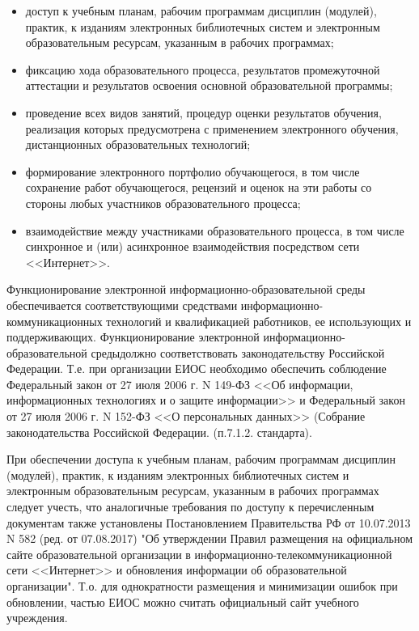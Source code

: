 \documentclass[10pt, a5paper]{article}
\begin{document}
\begin{itemize}
  \item доступ к учебным планам, рабочим программам дисциплин (модулей), практик, к изданиям электронных библиотечных систем и электронным образовательным ресурсам, указанным в рабочих программах;
  \item фиксацию хода образовательного процесса, результатов промежуточной аттестации и результатов освоения основной образовательной программы;
  \item проведение всех видов занятий, процедур оценки результатов обучения, реализация которых предусмотрена с применением электронного обучения, дистанционных образовательных технологий;
  \item формирование электронного портфолио обучающегося, в том числе сохранение работ обучающегося, рецензий и оценок на эти работы со стороны любых участников образовательного процесса;
  \item взаимодействие между участниками образовательного процесса, в том числе синхронное и (или) асинхронное взаимодействия посредством сети <<Интернет>>.
\end{itemize}

Функционирование электронной информационно-\linebreak образовательной среды обеспечивается соответствующими средствами информационно-коммуникационных технологий и квалификацией работников, ее использующих и поддерживающих. Функционирование электронной информационно-образовательной среды\linebreak должно соответствовать законодательству Российской Федерации. Т.е. при организации ЕИОС необходимо обеспечить соблюдение Федеральный закон от 27 июля 2006 г. N 149-ФЗ <<Об информации, информационных технологиях и о защите информации>> и Федеральный закон от 27 июля 2006 г. N 152-ФЗ <<О персональных данных>> (Собрание законодательства Российской Федерации. (п.7.1.2. стандарта).

При обеспечении доступа к учебным планам, рабочим программам дисциплин (модулей), практик, к изданиям электронных библиотечных систем и электронным образовательным ресурсам, указанным в рабочих программах следует учесть, что аналогичные требования по доступу к перечисленным документам также установлены Постановлением Правительства РФ от 10.07.2013 N 582 (ред. от 07.08.2017) "Об утверждении Правил размещения на официальном сайте образовательной организации в информационно-телекоммуникационной сети <<Интернет>> и обновления информации об образовательной организации". Т.о. для однократности размещения и минимизации ошибок при обновлении, частью ЕИОС можно считать официальный сайт учебного учреждения.
\end{document}

